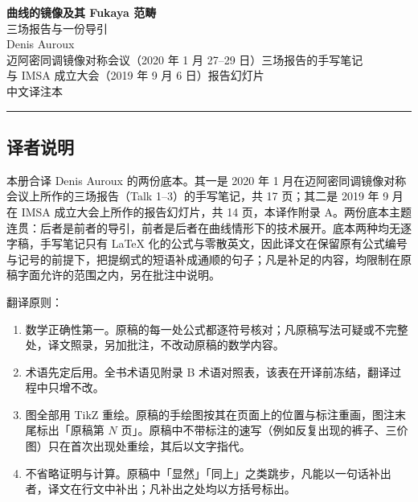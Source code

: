 \thispagestyle{plain}

\begin{center}
\vspace*{1.2cm}
{\LARGE\bfseries 曲线的镜像及其 Fukaya 范畴}\\[0.45em]
{\large 三场报告与一份导引}\\[1.0em]
{\large Denis Auroux}\\[1.4em]
{\normalsize
迈阿密同调镜像对称会议（2020 年 1 月 27--29 日）三场报告的手写笔记\\
与 IMSA 成立大会（2019 年 9 月 6 日）报告幻灯片}\\[1.2em]
{\normalsize 中文译注本}

\vspace{0.8em}
\noindent\rule{\textwidth}{0.4pt}
\end{center}

\subsection*{译者说明}

本册合译 Denis Auroux 的两份底本。其一是 2020 年 1 月在迈阿密同调镜像对称会议上所作的三场报告（Talk 1--3）的手写笔记，共 17 页；其二是 2019 年 9 月在 IMSA 成立大会上所作的报告幻灯片，共 14 页，本译作附录 A。两份底本主题连贯：后者是前者的导引，前者是后者在曲线情形下的技术展开。底本两种均无逐字稿，手写笔记只有 LaTeX 化的公式与零散英文，因此译文在保留原有公式编号与记号的前提下，把提纲式的短语补成通顺的句子；凡是补足的内容，均限制在原稿字面允许的范围之内，另在批注中说明。

翻译原则：
\begin{enumerate}
  \item 数学正确性第一。原稿的每一处公式都逐符号核对；凡原稿写法可疑或不完整处，译文照录，另加批注，不改动原稿的数学内容。
  \item 术语先定后用。全书术语见附录 B 术语对照表，该表在开译前冻结，翻译过程中只增不改。
  \item 图全部用 TikZ 重绘。原稿的手绘图按其在页面上的位置与标注重画，图注末尾标出「原稿第 $N$ 页」。原稿中不带标注的速写（例如反复出现的裤子、三价图）只在首次出现处重绘，其后以文字指代。
  \item 不省略证明与计算。原稿中「显然」「同上」之类跳步，凡能以一句话补出者，译文在行文中补出；凡补出之处均以方括号标出。
\end{enumerate}


